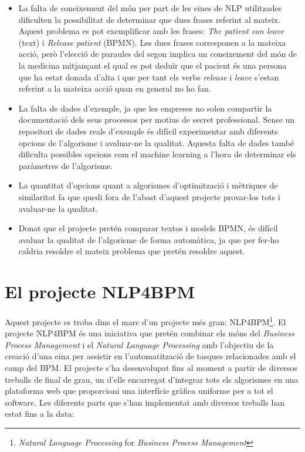 \begin{itemize}
    \item La falta de coneixement del món per part de les eines de NLP utilitzades dificulten la possibilitat de determinar que dues frases  referint al mateix. Aquest problema es pot exemplificar amb les frases: \emph{The patient can leave} (text) i \emph{Release patient} (BPMN). Les dues frases corresponen a la mateixa acció, però l'elecció de paraules del segon implica un coneixement del món de la medicina mitjançant el qual es pot deduïr que el pacient és una persona que ha estat donada d'alta i que per tant els verbs \emph{release} i \emph{leave} s'estan referint a la mateixa acció quan en general no ho fan. 
    \item La falta de dades d'exemple, ja que les empreses no solen compartir la documentació dels seus processos per motius de secret professional. Sense un repositori de dades reals d'exemple és difícil experimentar amb diferents opcions de l'algorisme i avaluar-ne la qualitat. Aquesta falta de dades també dificulta possibles opcions com el machine learning a l'hora de determinar els paràmetres de l'algorisme.
    \item La quantitat d'opcions quant a algorismes d'optimització i mètriques de similaritat fa que quedi fora de l'abast d'aquest projecte provar-los tots i avaluar-ne la qualitat.
    \item Donat que el projecte pretén comparar textos i models BPMN, és difícil avaluar la qualitat de l'algorisme de forma automàtica, ja que per fer-ho caldria resoldre el mateix problema que pretén resoldre aquest.
\end{itemize}



\section{El projecte NLP4BPM}

Aquest projecte es troba dins el marc d'un projecte més gran: NLP4BPM\footnote{\emph{Natural Language Processing} for \emph{Business Process Management}}. El projecte NLP4BPM és una iniciativa que pretén combinar els móns del \emph{Business Process Management} i el \emph{Natural Language Processing} amb l'objectiu de la creació d'una eina per assistir en l'automatització de tasques relacionades amb el camp del BPM. El projecte s'ha desenvolupat fins al moment a partir de diversos treballs de final de grau, un d'ells encarregat d'integrar tots els algorismes en una plataforma web que proporcioni una interfície gràfica uniforme per a tot el software. Les diferents parts que s'han implementat amb diversos treballs han estat fins a la data:

